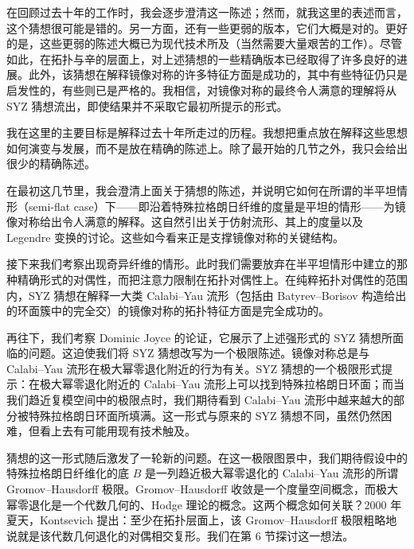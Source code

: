 
在回顾过去十年的工作时，我会逐步澄清这一陈述；然而，就我这里的表述而言，这个猜想很可能是错的。另一方面，还有一些更弱的版本，它们大概是对的。更好的是，这些更弱的陈述大概已为现代技术所及（当然需要大量艰苦的工作）。尽管如此，在拓扑与辛的层面上，对上述猜想的一些精确版本已经取得了许多良好的进展。此外，该猜想在解释镜像对称的许多特征方面是成功的，其中有些特征仍只是启发性的，有些则已是严格的。我相信，对镜像对称的最终令人满意的理解将从 SYZ 猜想流出，即使结果并不采取它最初所提示的形式。

我在这里的主要目标是解释过去十年所走过的历程。我想把重点放在解释这些思想如何演变与发展，而不是放在精确的陈述上。除了最开始的几节之外，我只会给出很少的精确陈述。

在最初这几节里，我会澄清上面关于猜想的陈述，并说明它如何在所谓的半平坦情形（semi-flat case）下------即沿着特殊拉格朗日纤维的度量是平坦的情形------为镜像对称给出令人满意的解释。这自然引出关于仿射流形、其上的度量以及 Legendre 变换的讨论。这些如今看来正是支撑镜像对称的关键结构。

接下来我们考察出现奇异纤维的情形。此时我们需要放弃在半平坦情形中建立的那种精确形式的对偶性，而把注意力限制在拓扑对偶性上。在纯粹拓扑对偶性的范围内，SYZ 猜想在解释一大类 Calabi--Yau 流形（包括由 Batyrev--Borisov 构造给出的环面簇中的完全交）的镜像对称的拓扑特征方面是完全成功的。

再往下，我们考察 Dominic Joyce 的论证，它展示了上述强形式的 SYZ 猜想所面临的问题。这迫使我们将 SYZ 猜想改写为一个极限陈述。镜像对称总是与 Calabi--Yau 流形在极大幂零退化附近的行为有关。SYZ 猜想的一个极限形式提示：在极大幂零退化附近的 Calabi--Yau 流形上可以找到特殊拉格朗日环面；而当我们趋近复模空间中的极限点时，我们期待看到 Calabi--Yau 流形中越来越大的部分被特殊拉格朗日环面所填满。这一形式与原来的 SYZ 猜想不同，虽然仍然困难，但看上去有可能用现有技术触及。


猜想的这一形式随后激发了一轮新的问题。在这一极限图景中，我们期待假设中的特殊拉格朗日纤维化的底 $B$ 是一列趋近极大幂零退化的 Calabi--Yau 流形的所谓 Gromov--Hausdorff 极限。Gromov--Hausdorff 收敛是一个度量空间概念，而极大幂零退化是一个代数几何的、Hodge 理论的概念。这两个概念如何关联？2000 年夏天，Kontsevich 提出：至少在拓扑层面上，该 Gromov--Hausdorff 极限粗略地说就是该代数几何退化的对偶相交复形。我们在第 6 节探讨这一想法。

